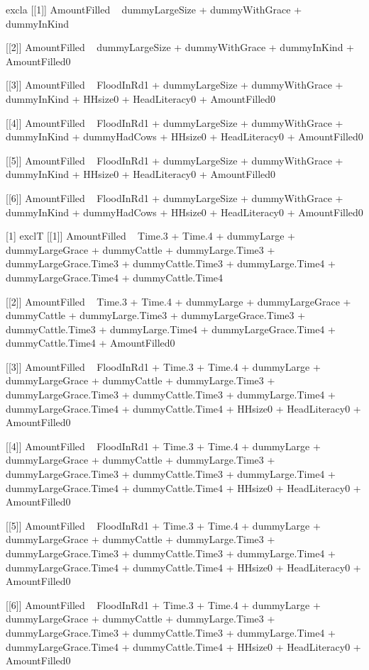 \begin{Schunk}
\begin{Soutput}
[1] excla
[[1]]
AmountFilled ~ dummyLargeSize + dummyWithGrace + dummyInKind

[[2]]
AmountFilled ~ dummyLargeSize + dummyWithGrace + dummyInKind + 
    AmountFilled0

[[3]]
AmountFilled ~ FloodInRd1 + dummyLargeSize + dummyWithGrace + 
    dummyInKind + HHsize0 + HeadLiteracy0 + AmountFilled0

[[4]]
AmountFilled ~ FloodInRd1 + dummyLargeSize + dummyWithGrace + 
    dummyInKind + dummyHadCows + HHsize0 + HeadLiteracy0 + AmountFilled0

[[5]]
AmountFilled ~ FloodInRd1 + dummyLargeSize + dummyWithGrace + 
    dummyInKind + HHsize0 + HeadLiteracy0 + AmountFilled0

[[6]]
AmountFilled ~ FloodInRd1 + dummyLargeSize + dummyWithGrace + 
    dummyInKind + dummyHadCows + HHsize0 + HeadLiteracy0 + AmountFilled0

[1] exclT
[[1]]
AmountFilled ~ Time.3 + Time.4 + dummyLarge + dummyLargeGrace + 
    dummyCattle + dummyLarge.Time3 + dummyLargeGrace.Time3 + 
    dummyCattle.Time3 + dummyLarge.Time4 + dummyLargeGrace.Time4 + 
    dummyCattle.Time4

[[2]]
AmountFilled ~ Time.3 + Time.4 + dummyLarge + dummyLargeGrace + 
    dummyCattle + dummyLarge.Time3 + dummyLargeGrace.Time3 + 
    dummyCattle.Time3 + dummyLarge.Time4 + dummyLargeGrace.Time4 + 
    dummyCattle.Time4 + AmountFilled0

[[3]]
AmountFilled ~ FloodInRd1 + Time.3 + Time.4 + dummyLarge + dummyLargeGrace + 
    dummyCattle + dummyLarge.Time3 + dummyLargeGrace.Time3 + 
    dummyCattle.Time3 + dummyLarge.Time4 + dummyLargeGrace.Time4 + 
    dummyCattle.Time4 + HHsize0 + HeadLiteracy0 + AmountFilled0

[[4]]
AmountFilled ~ FloodInRd1 + Time.3 + Time.4 + dummyLarge + dummyLargeGrace + 
    dummyCattle + dummyLarge.Time3 + dummyLargeGrace.Time3 + 
    dummyCattle.Time3 + dummyLarge.Time4 + dummyLargeGrace.Time4 + 
    dummyCattle.Time4 + HHsize0 + HeadLiteracy0 + AmountFilled0

[[5]]
AmountFilled ~ FloodInRd1 + Time.3 + Time.4 + dummyLarge + dummyLargeGrace + 
    dummyCattle + dummyLarge.Time3 + dummyLargeGrace.Time3 + 
    dummyCattle.Time3 + dummyLarge.Time4 + dummyLargeGrace.Time4 + 
    dummyCattle.Time4 + HHsize0 + HeadLiteracy0 + AmountFilled0

[[6]]
AmountFilled ~ FloodInRd1 + Time.3 + Time.4 + dummyLarge + dummyLargeGrace + 
    dummyCattle + dummyLarge.Time3 + dummyLargeGrace.Time3 + 
    dummyCattle.Time3 + dummyLarge.Time4 + dummyLargeGrace.Time4 + 
    dummyCattle.Time4 + HHsize0 + HeadLiteracy0 + AmountFilled0


\end{Soutput}
\end{Schunk}
